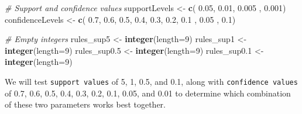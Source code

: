 \documentclass[
]{article}
\newenvironment{Shaded}{\begin{snugshade}}{\end{snugshade}}
\newcommand{\AttributeTok}[1]{\textcolor[rgb]{0.13,0.29,0.53}{#1}}
\newcommand{\CommentTok}[1]{\textcolor[rgb]{0.56,0.35,0.01}{\textit{#1}}}
\newcommand{\DecValTok}[1]{\textcolor[rgb]{0.00,0.00,0.81}{#1}}
\newcommand{\FloatTok}[1]{\textcolor[rgb]{0.00,0.00,0.81}{#1}}
\newcommand{\FunctionTok}[1]{\textcolor[rgb]{0.13,0.29,0.53}{\textbf{#1}}}
\newcommand{\NormalTok}[1]{#1}
\newcommand{\OtherTok}[1]{\textcolor[rgb]{0.56,0.35,0.01}{#1}}
\begin{document}
\begin{Shaded}
\begin{Highlighting}[]
\CommentTok{\# Support and confidence values}
\NormalTok{supportLevels }\OtherTok{\textless{}{-}} \FunctionTok{c}\NormalTok{( }\FloatTok{0.05}\NormalTok{, }\FloatTok{0.01}\NormalTok{, }\FloatTok{0.005}\NormalTok{ , }\FloatTok{0.001}\NormalTok{)}
\NormalTok{confidenceLevels }\OtherTok{\textless{}{-}} \FunctionTok{c}\NormalTok{(  }\FloatTok{0.7}\NormalTok{, }\FloatTok{0.6}\NormalTok{, }\FloatTok{0.5}\NormalTok{, }\FloatTok{0.4}\NormalTok{, }\FloatTok{0.3}\NormalTok{, }\FloatTok{0.2}\NormalTok{, }\FloatTok{0.1}\NormalTok{ , }\FloatTok{0.05}\NormalTok{ , }\FloatTok{0.1}\NormalTok{)}

\CommentTok{\# Empty integers }
\NormalTok{rules\_sup5 }\OtherTok{\textless{}{-}} \FunctionTok{integer}\NormalTok{(}\AttributeTok{length=}\DecValTok{9}\NormalTok{)}
\NormalTok{rules\_sup1 }\OtherTok{\textless{}{-}} \FunctionTok{integer}\NormalTok{(}\AttributeTok{length=}\DecValTok{9}\NormalTok{)}
\NormalTok{rules\_sup0}\FloatTok{.5} \OtherTok{\textless{}{-}} \FunctionTok{integer}\NormalTok{(}\AttributeTok{length=}\DecValTok{9}\NormalTok{)}
\NormalTok{rules\_sup0}\FloatTok{.1} \OtherTok{\textless{}{-}} \FunctionTok{integer}\NormalTok{(}\AttributeTok{length=}\DecValTok{9}\NormalTok{)}
\end{Highlighting}
\end{Shaded}

We will test \texttt{support\ values} of 5, 1, 0.5, and 0.1, along with
\texttt{confidence\ values} of 0.7, 0.6, 0.5, 0.4, 0.3, 0.2, 0.1, 0.05,
and 0.01 to determine which combination of these two parameters works
best together.
\end{document}
